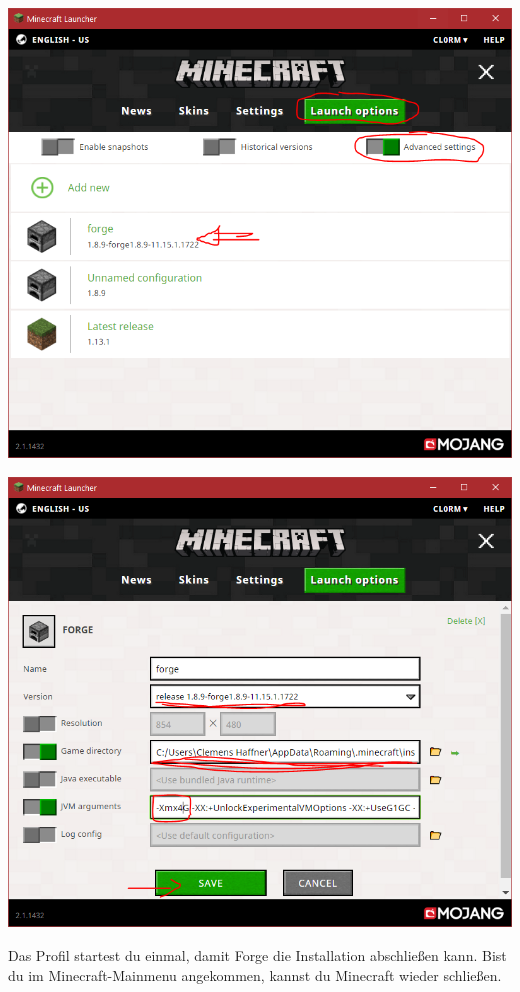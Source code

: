 \includegraphics[scale=0.4, center]{TeX_files/pics/installation_1.png}

\includegraphics[scale=0.4, center]{TeX_files/pics/installation_advanced_settings.png}

Das Profil startest du einmal, damit Forge die Installation abschließen kann. Bist du im Minecraft-Mainmenu angekommen, kannst du Minecraft wieder schließen.

